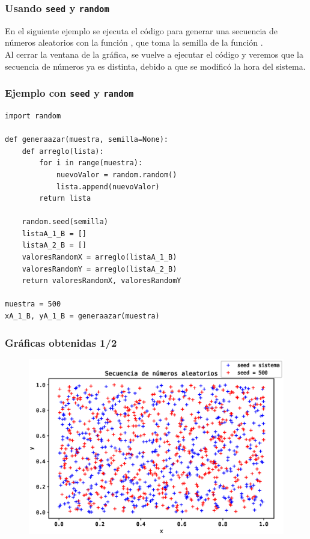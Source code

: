 \begin{frame}
\frametitle{Usando \texttt{seed} y \texttt{random}}
En el siguiente ejemplo se ejecuta el código para generar una secuencia de números aleatorios con la función , que toma la semilla de la función .
\\
\bigskip
Al cerrar la ventana de la gráfica, se vuelve a ejecutar el código y veremos que la secuencia de números ya es distinta, debido a que se modificó la hora del sistema.
\end{frame}
\begin{frame}
\frametitle{Ejemplo con \texttt{seed} y \texttt{random}}
\begin{lstlisting}[caption=Ejemplo de uso de las funciones del módulo \texttt{random}, style=codigopython]
import random

def generaazar(muestra, semilla=None):
    def arreglo(lista):
        for i in range(muestra):
            nuevoValor = random.random()
            lista.append(nuevoValor)
        return lista
    
    random.seed(semilla)    
    listaA_1_B = []
    listaA_2_B = []
    valoresRandomX = arreglo(listaA_1_B)
    valoresRandomY = arreglo(listaA_2_B)
    return valoresRandomX, valoresRandomY

muestra = 500
xA_1_B, yA_1_B = generaazar(muestra)
\end{lstlisting}
\end{frame}
\begin{frame}
\frametitle{Gráficas obtenidas 1/2}
\begin{figure}[h!]
  \centering
  \includegraphics[scale=0.5]{Imagenes/Secuencia_aleatoria_03.eps}
\end{figure}
\end{frame}
